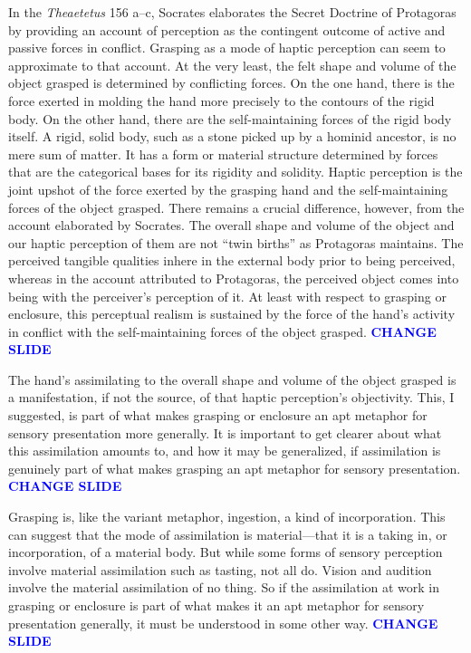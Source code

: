 \documentclass[12pt]{article}
\newcommand{\change}{\textcolor{blue}{\textbf{CHANGE SLIDE}}}
\begin{document}
In the \emph{Theaetetus} 156 a--c, Socrates elaborates the Secret Doctrine of Protagoras by providing an account of perception as the contingent outcome of active and passive forces in conflict. Grasping as a mode of haptic perception can seem to approximate to that account. At the very least, the felt shape and volume of the object grasped is determined by conflicting forces. On the one hand, there is the force exerted in molding the hand more precisely to the contours of the rigid body. On the other hand, there are the self-maintaining forces of the rigid body itself. A rigid, solid body, such as a stone picked up by a hominid ancestor, is no mere sum of matter. It has a form or material structure determined by forces that are the categorical bases for its rigidity and solidity. Haptic perception is the joint upshot of the force exerted by the grasping hand and the self-maintaining forces of the object grasped. There remains a crucial difference, however, from the account elaborated by Socrates. The overall shape and volume of the object and our haptic perception of them are not ``twin births'' as Protagoras maintains. The perceived tangible qualities inhere in the external body prior to being perceived, whereas in the account attributed to Protagoras, the perceived object comes into being with the perceiver's perception of it. At least with respect to grasping or enclosure, this perceptual realism is sustained by the force of the hand's activity in conflict with the self-maintaining forces of the object grasped. \change

The hand's assimilating to the overall shape and volume of the object grasped is a manifestation, if not the source, of that haptic perception's objectivity. This, I suggested, is part of what makes grasping or enclosure an apt metaphor for sensory presentation more generally. It is important to get clearer about what this assimilation amounts to, and how it may be generalized, if assimilation is genuinely part of what makes grasping an apt metaphor for sensory presentation. \change

Grasping is, like the variant meta\-phor, ingestion, a kind of incorporation. This can suggest that the mode of assimilation is material---that it is a taking in, or incorporation, of a material body. But while some forms of sensory perception involve material assimilation such as tasting, not all do. Vision and audition involve the material assimilation of no thing. So if the assimilation at work in grasping or enclosure is part of what makes it an apt metaphor for sensory presentation generally, it must be understood in some other way. \change
\end{document}
